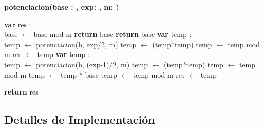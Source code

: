\textbf{potenciacion(base : \entero,  exp: \entero,  m: \entero)}\\
	\begin{algorithm}[H]
		\BlankLine
		\textbf{var} res : \entero \\
		\BlankLine
		base $\leftarrow$ base mod m 
		\BlankLine
		 	{\textbf{return} base}
		{
			{\textbf{return} base}
		{
			{\textbf{var} temp : \entero \\
			temp $\leftarrow$ potenciacion(b, exp/2, m) 
			temp $\leftarrow$ (temp*temp) 
			temp $\leftarrow$ temp mod m 
			res $\leftarrow$ temp }
			{\textbf{var} temp : \entero \\
			temp $\leftarrow$ potenciacion(b, (exp-1)/2, m) 
			temp $\leftarrow$ (temp*temp) 
			temp $\leftarrow$ temp mod m 
			temp $\leftarrow$ temp * base 
			temp $\leftarrow$ temp mod m 
			res $\leftarrow$ temp }
		}}
		\BlankLine
		
		\textbf{return} res
	
	\end{algorithm}


\subsection{Detalles de Implementación}

